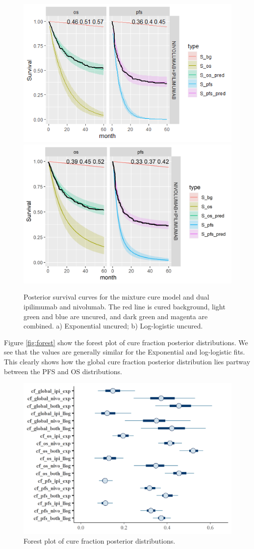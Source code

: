 \documentclass[
]{article}
\begin{document}
\begin{figure}

{\centering \includegraphics[width=0.4\linewidth]{../plots/S_plots_exp_exp_cf_hier_bg_fixed_NIVO+IPI} \includegraphics[width=0.4\linewidth]{../plots/S_plots_loglogistic_loglogistic_cf hier_bg_fixed_NIVOLUMAB+IPILIMUMAB} 

}

\caption{\label{fig:NIVO+IPI}Posterior survival curves for the mixture cure model and dual ipilimumab and nivolumab. The red line is cured background, light green and blue are uncured, and dark green and magenta are combined. a) Exponential uncured; b) Log-logistic uncured.}\label{fig:unnamed-chunk-5}
\end{figure}

Figure \ref{fig:forest} show the forest plot of cure fraction posterior
distributions. We see that the values are generally similar for the
Exponential and log-logistic fits. This clearly shows how the global
cure fraction posterior distribution lies partway between the PFS and OS
distributions.

\begin{figure}

{\centering \includegraphics[width=0.6\linewidth]{../plots/cf_forest_plot} 

}

\caption{\label{fig:forest}Forest plot of cure fraction posterior distributions.}\label{fig:unnamed-chunk-6}
\end{figure}
\end{document}

